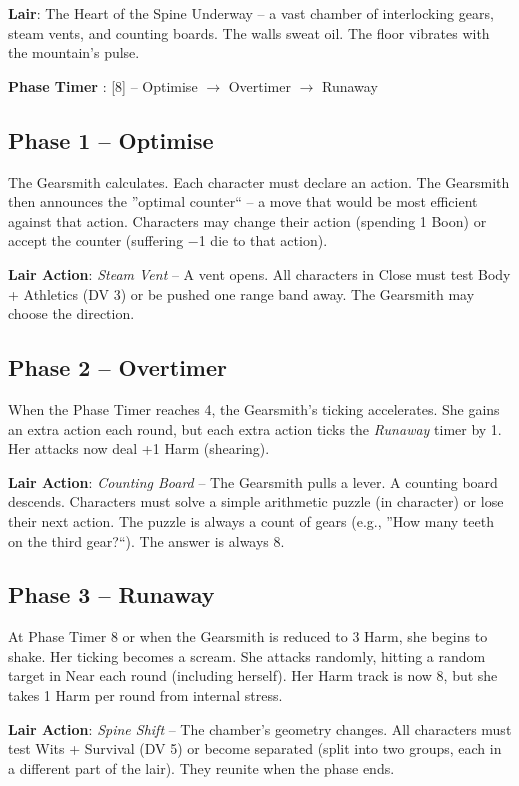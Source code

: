 \noindent\textbf{Lair}: The Heart of the Spine Underway -- a vast chamber of interlocking gears, steam vents, and counting boards. The walls sweat oil. The floor vibrates with the mountain's pulse.

\noindent\textbf{Phase Timer }: [8] -- Optimise $\rightarrow$ Overtimer $\rightarrow$ Runaway

\subsection*{Phase 1 -- Optimise}

\noindent The Gearsmith calculates. Each character must declare an action. The Gearsmith then announces the ''optimal counter`` -- a move that would be most efficient against that action. Characters may change their action (spending 1 Boon) or accept the counter (suffering −1 die to that action).

\noindent\textbf{Lair Action}: \emph{Steam Vent} -- A vent opens. All characters in Close must test Body + Athletics (DV 3) or be pushed one range band away. The Gearsmith may choose the direction.

\subsection*{Phase 2 -- Overtimer}

\noindent When the Phase Timer reaches 4, the Gearsmith's ticking accelerates. She gains an extra action each round, but each extra action ticks the \emph{Runaway} timer by 1. Her attacks now deal +1 Harm (shearing).

\noindent\textbf{Lair Action}: \emph{Counting Board} -- The Gearsmith pulls a lever. A counting board descends. Characters must solve a simple arithmetic puzzle (in character) or lose their next action. The puzzle is always a count of gears (e.g., ''How many teeth on the third gear?``). The answer is always 8.

\subsection*{Phase 3 -- Runaway}

\noindent At Phase Timer 8 or when the Gearsmith is reduced to 3 Harm, she begins to shake. Her ticking becomes a scream. She attacks randomly, hitting a random target in Near each round (including herself). Her Harm track is now 8, but she takes 1 Harm per round from internal stress.

\noindent\textbf{Lair Action}: \emph{Spine Shift} -- The chamber's geometry changes. All characters must test Wits + Survival (DV 5) or become separated (split into two groups, each in a different part of the lair). They reunite when the phase ends.

